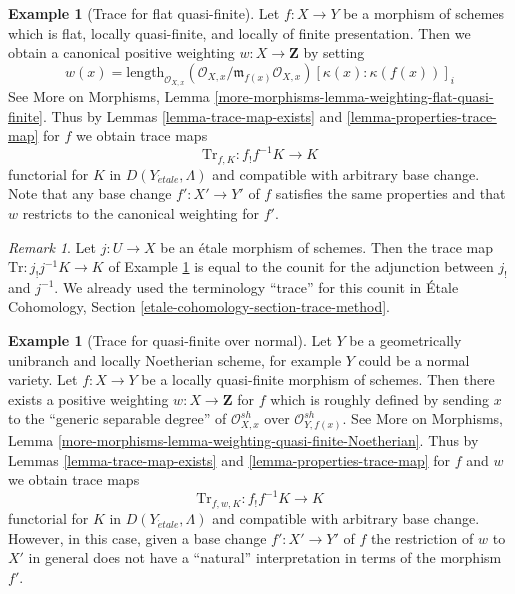 \documentclass{stacks-project}
\theoremstyle{plain}
\theoremstyle{definition}
\newtheorem{example}[subsection]{Example}
\theoremstyle{remark}
\newtheorem{remark}[subsection]{Remark}
\numberwithin{equation}{subsection}
\def\etale{{\acute{e}tale}}
\begin{document}
\begin{example}[Trace for flat quasi-finite]
\label{example-trace-for-flat-quasi-finite}
Let $f : X \to Y$ be a morphism of schemes which is flat,
locally quasi-finite, and locally of finite presentation.
Then we obtain a canonical positive weighting $w : X \to \mathbf{Z}$
by setting
$$
w(x) = \text{length}_{\mathcal{O}_{X, x}}
(\mathcal{O}_{X, x}/\mathfrak m_{f(x)} \mathcal{O}_{X, x})
[\kappa(x) : \kappa(f(x))]_i
$$
See More on Morphisms, Lemma
\ref{more-morphisms-lemma-weighting-flat-quasi-finite}.
Thus by Lemmas \ref{lemma-trace-map-exists} and
\ref{lemma-properties-trace-map} for $f$ we obtain trace maps
$$
\text{Tr}_{f, K} : f_!f^{-1}K \longrightarrow K
$$
functorial for $K$ in $D(Y_\etale, \Lambda)$ and compatible
with arbitrary base change. Note that any base change
$f' : X' \to Y'$ of $f$ satisfies the same properties and that $w$
restricts to the canonical weighting for $f'$.
\end{example}

\begin{remark}
\label{remark-trace-etale-counit}
Let $j : U \to X$ be an \'etale morphism of schemes. Then the trace
map $\text{Tr} : j_!j^{-1}K \to K$ of
Example \ref{example-trace-for-flat-quasi-finite} is equal to the
counit for the adjunction between $j_!$ and $j^{-1}$.
We already used the terminology ``trace'' for this counit in
\'Etale Cohomology, Section \ref{etale-cohomology-section-trace-method}.
\end{remark}

\begin{example}[Trace for quasi-finite over normal]
\label{example-trace-for-quasi-finite-over-normal}
Let $Y$ be a geometrically unibranch and locally Noetherian scheme,
for example $Y$ could be a normal variety. Let $f : X \to Y$ be a locally
quasi-finite morphism of schemes. Then there exists a
positive weighting $w : X \to \mathbf{Z}$ for $f$
which is roughly defined by sending $x$ to the
``generic separable degree''
of $\mathcal{O}_{X, x}^{sh}$ over $\mathcal{O}_{Y, f(x)}^{sh}$.
See More on Morphisms, Lemma
\ref{more-morphisms-lemma-weighting-quasi-finite-Noetherian}.
Thus by Lemmas \ref{lemma-trace-map-exists} and
\ref{lemma-properties-trace-map} for $f$ and $w$ we obtain trace maps
$$
\text{Tr}_{f, w, K} : f_!f^{-1}K \longrightarrow K
$$
functorial for $K$ in $D(Y_\etale, \Lambda)$ and compatible
with arbitrary base change. However, in this case, given a base change
$f' : X' \to Y'$ of $f$ the restriction of $w$ to $X'$ in general
does not have a ``natural'' interpretation in terms of the
morphism $f'$.
\end{example}
\end{document}

